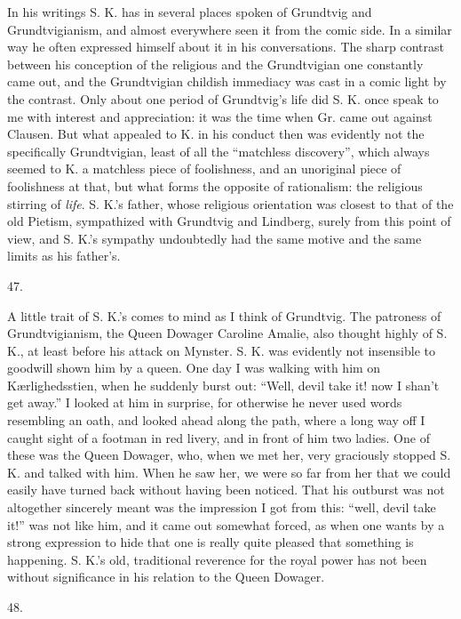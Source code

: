 \documentclass[12pt,a4paper,openany]{book}
\newcommand{\secnum}[1]{\par\begin{center}#1\end{center}\par\nobreak}
\newcommand{\opage}[1]{\marginnote{\footnotesize\textit{[#1]}}}
\begin{document}
In his writings S. K. has in several places spoken of Grundtvig and
Grundtvigianism, and almost everywhere seen it from the comic side. In a
similar way he often expressed himself about it in his conversations. The
sharp contrast between his conception of the religious and the Grundtvigian
one constantly came out, and the Grundtvigian childish immediacy was cast in
a comic light by the contrast. Only about one period of Grundtvig's life did
S. K. once speak to me with interest and appreciation: it was the time when
Gr. came out against Clausen. But what appealed to K. in his conduct then was
evidently not the specifically Grundtvigian, least of all the ``matchless
discovery'', which always seemed to K. a matchless piece of foolishness, and
an unoriginal piece of foolishness at that, but what forms the
opposite of rationalism: the religious stirring of \emph{life}. S. K.'s
father, whose religious orientation was closest to that of the old Pietism,
sympathized with Grundtvig and Lindberg, surely from this point of view, and
S. K.'s sympathy undoubtedly had the same motive and the same limits as his
father's.

\secnum{47.}

A little trait of S. K.'s comes to mind as I think of Grundtvig. The
patroness of Grundtvigianism, the Queen Dowager Caroline Amalie, also thought
highly of S. K., at least before his attack on Mynster. S. K. was evidently
not insensible to goodwill shown
\opage{371}him by a queen. One day I was walking with him on Kærlighedsstien,
when he suddenly burst out: ``Well, devil take it! now I shan't get away.'' I
looked at him in surprise, for otherwise he never used words resembling an
oath, and looked ahead along the path, where a long way off I caught sight of
a footman in red livery, and in front of him two ladies. One of these was the
Queen Dowager, who, when we met her, very graciously stopped S. K. and talked
with him. When he saw her, we were so far from her that we could easily have
turned back without having been noticed. That his outburst was not altogether
sincerely meant was the impression I got from this: ``well, devil take it!''
was not like him, and it came out somewhat forced, as when one wants by a
strong expression to hide that one is really quite pleased that something is
happening. S. K.'s old, traditional reverence for the royal power has not
been without significance in his relation to the Queen Dowager.

\secnum{48.}
\end{document}
